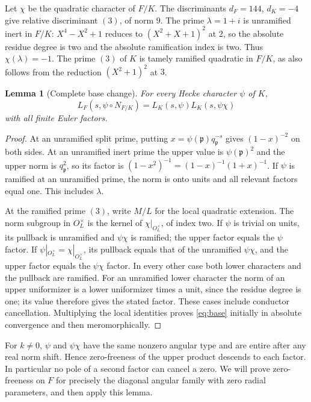 \documentclass[11pt,a4paper]{article}
\numberwithin{equation}{section}
\newtheorem{lemma}[theorem]{Lemma}
\theoremstyle{definition}
\theoremstyle{remark}
\begin{document}
Let $\chi$ be the quadratic character of $F/K$. The discriminants $d_F=144$, $d_K=-4$ give relative discriminant $(3)$, of norm $9$. The prime $\lambda=1+i$ is unramified inert in $F/K$: $X^4-X^2+1$ reduces to $(X^2+X+1)^2$ at $2$, so the absolute residue degree is two and the absolute ramification index is two. Thus $\chi(\lambda)=-1$. The prime $(3)$ of $K$ is tamely ramified quadratic in $F/K$, as also follows from the reduction $(X^2+1)^2$ at $3$.

\begin{lemma}[Complete base change]\label{lem:base}
For every Hecke character $\psi$ of $K$,
\begin{equation}\label{eq:base}
 L_F(s,\psi\circ N_{F/K})=L_K(s,\psi)L_K(s,\psi\chi)
\end{equation}
with all finite Euler factors.
\end{lemma}
\begin{proof}
At an unramified split prime, putting $x=\psi(\mathfrak p)q_{\mathfrak p}^{-s}$ gives $(1-x)^{-2}$ on both sides. At an unramified inert prime the upper value is $\psi(\mathfrak p)^2$ and the upper norm is $q_{\mathfrak p}^2$, so its factor is $(1-x^2)^{-1}=(1-x)^{-1}(1+x)^{-1}$. If $\psi$ is ramified at an unramified prime, the norm is onto units and all relevant factors equal one. This includes $\lambda$.

At the ramified prime $(3)$, write $M/L$ for the local quadratic extension. The norm subgroup in $O_L^\times$ is the kernel of $\chi|_{O_L^\times}$, of index two. If $\psi$ is trivial on units, its pullback is unramified and $\psi\chi$ is ramified; the upper factor equals the $\psi$ factor. If $\psi|_{O_L^\times}=\chi|_{O_L^\times}$, its pullback equals that of the unramified $\psi\chi$, and the upper factor equals the $\psi\chi$ factor. In every other case both lower characters and the pullback are ramified. For an unramified lower character the norm of an upper uniformizer is a lower uniformizer times a unit, since the residue degree is one; its value therefore gives the stated factor. These cases include conductor cancellation. Multiplying the local identities proves \eqref{eq:base} initially in absolute convergence and then meromorphically.
\end{proof}

For $k\ne0$, $\psi$ and $\psi\chi$ have the same nonzero angular type and are entire after any real norm shift. Hence zero-freeness of the upper product descends to each factor. In particular no pole of a second factor can cancel a zero. We will prove zero-freeness on $F$ for precisely the diagonal angular family with zero radial parameters, and then apply this lemma.
\end{document}
